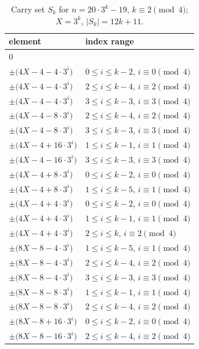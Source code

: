 \begin{table}[htbp]\centering\small
\caption{Carry set $S_k$ for $n=20\cdot 3^k - 19$, $k\equiv 2\pmod{4}$; $X=3^k$, $|S_k|=12k+11$.}
\begin{tabular}{ll}\toprule
element & index range \\ \midrule
$0$ & \\
$\pm\bigl(4X - 4 - 4\cdot 3^i\bigr)$ & $0\le i\le k-2$, $i\equiv 0\pmod 4$ \\
$\pm\bigl(4X - 4 - 4\cdot 3^i\bigr)$ & $2\le i\le k-4$, $i\equiv 2\pmod 4$ \\
$\pm\bigl(4X - 4 - 4\cdot 3^i\bigr)$ & $3\le i\le k-3$, $i\equiv 3\pmod 4$ \\
$\pm\bigl(4X - 4 - 8\cdot 3^i\bigr)$ & $2\le i\le k-4$, $i\equiv 2\pmod 4$ \\
$\pm\bigl(4X - 4 - 8\cdot 3^i\bigr)$ & $3\le i\le k-3$, $i\equiv 3\pmod 4$ \\
$\pm\bigl(4X - 4 + 16\cdot 3^i\bigr)$ & $1\le i\le k-1$, $i\equiv 1\pmod 4$ \\
$\pm\bigl(4X - 4 - 16\cdot 3^i\bigr)$ & $3\le i\le k-3$, $i\equiv 3\pmod 4$ \\
$\pm\bigl(4X - 4 + 8\cdot 3^i\bigr)$ & $0\le i\le k-2$, $i\equiv 0\pmod 4$ \\
$\pm\bigl(4X - 4 + 8\cdot 3^i\bigr)$ & $1\le i\le k-5$, $i\equiv 1\pmod 4$ \\
$\pm\bigl(4X - 4 + 4\cdot 3^i\bigr)$ & $0\le i\le k-2$, $i\equiv 0\pmod 4$ \\
$\pm\bigl(4X - 4 + 4\cdot 3^i\bigr)$ & $1\le i\le k-1$, $i\equiv 1\pmod 4$ \\
$\pm\bigl(4X - 4 + 4\cdot 3^i\bigr)$ & $2\le i\le k$, $i\equiv 2\pmod 4$ \\
$\pm\bigl(8X - 8 - 4\cdot 3^i\bigr)$ & $1\le i\le k-5$, $i\equiv 1\pmod 4$ \\
$\pm\bigl(8X - 8 - 4\cdot 3^i\bigr)$ & $2\le i\le k-4$, $i\equiv 2\pmod 4$ \\
$\pm\bigl(8X - 8 - 4\cdot 3^i\bigr)$ & $3\le i\le k-3$, $i\equiv 3\pmod 4$ \\
$\pm\bigl(8X - 8 - 8\cdot 3^i\bigr)$ & $1\le i\le k-1$, $i\equiv 1\pmod 4$ \\
$\pm\bigl(8X - 8 - 8\cdot 3^i\bigr)$ & $2\le i\le k-4$, $i\equiv 2\pmod 4$ \\
$\pm\bigl(8X - 8 + 16\cdot 3^i\bigr)$ & $0\le i\le k-2$, $i\equiv 0\pmod 4$ \\
$\pm\bigl(8X - 8 - 16\cdot 3^i\bigr)$ & $2\le i\le k-4$, $i\equiv 2\pmod 4$ \\

\end{tabular}
\end{table}

